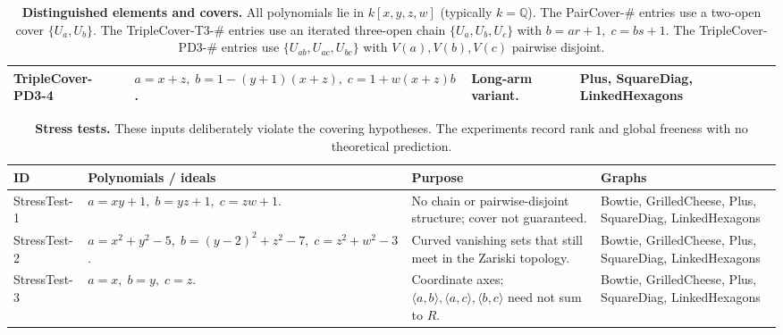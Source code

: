 \documentclass{article}
\newcommand{\Q}{\mathbb Q}
\begin{document}
\begin{table}[ht]
\begin{tabularx}{\linewidth}{|l|Y|Y|Y|}
TripleCover-PD3-4 &
\(a=x+z,\; b=1-(y+1)(x+z),\; c=1+w(x+z)b\). &
Long-arm variant. &
Plus,\; SquareDiag,\; LinkedHexagons \\
\hline

\end{tabularx}
\caption{\textbf{Distinguished elements and covers.} All polynomials lie in \(k[x,y,z,w]\) (typically \(k=\Q\)). The PairCover-\(\#\) entries use a two-open cover \(\{U_a,U_b\}\). The TripleCover-T3-\(\#\) entries use an iterated three-open chain \(\{U_a,U_b,U_c\}\) with \(b=ar+1,\; c=bs+1\). The TripleCover-PD3-\(\#\) entries use \(\{U_{ab},U_{ac},U_{bc}\}\) with \(V(a),V(b),V(c)\) pairwise disjoint.}
\label{tab:structured-covers}
\end{table}

\begin{table}[ht]
\centering
\footnotesize
\setlength{\extrarowheight}{0.25em}
\begin{tabularx}{\linewidth}{|l|Y|Y|Y|}
\hline
\textbf{ID} &
\textbf{Polynomials / ideals} &
\textbf{Purpose} &
\textbf{Graphs} \\
\hline\hline

StressTest-1 &
\(a=xy+1,\; b=yz+1,\; c=zw+1\). &
No chain or pairwise-disjoint structure; cover not guaranteed. &
Bowtie,\; GrilledCheese,\; Plus,\; SquareDiag,\; LinkedHexagons \\
\hline

StressTest-2 &
\(a=x^2+y^2-5,\; b=(y-2)^2+z^2-7,\; c=z^2+w^2-3\). &
Curved vanishing sets that still meet in the Zariski topology. &
Bowtie,\; GrilledCheese,\; Plus,\; SquareDiag,\; LinkedHexagons \\
\hline

StressTest-3 &
\(a=x,\; b=y,\; c=z\). &
Coordinate axes; \(\langle a,b\rangle,\langle a,c\rangle,\langle b,c\rangle\) need not sum to \(R\). &
Bowtie,\; GrilledCheese,\; Plus,\; SquareDiag,\; LinkedHexagons \\
\hline

\end{tabularx}
\caption{\textbf{Stress tests.} These inputs deliberately violate the covering hypotheses. The experiments record rank and global freeness with no theoretical prediction.}
\label{tab:stress-tests}
\end{table}
\end{document}
